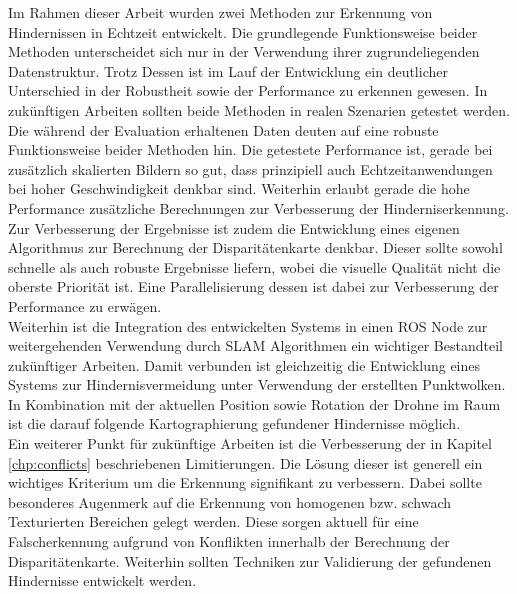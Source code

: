 Im Rahmen dieser Arbeit wurden zwei Methoden zur Erkennung von Hindernissen in Echtzeit entwickelt. Die grundlegende Funktionsweise beider Methoden unterscheidet sich nur in der Verwendung ihrer zugrundeliegenden Datenstruktur. Trotz Dessen ist im Lauf der Entwicklung ein deutlicher Unterschied in der Robustheit sowie der Performance zu erkennen gewesen. In zukünftigen Arbeiten sollten beide Methoden in realen Szenarien getestet werden.\\

\noindent
Die während der Evaluation erhaltenen Daten deuten auf eine robuste Funktionsweise beider Methoden hin. Die getestete Performance ist, gerade bei zusätzlich skalierten Bildern so gut, dass prinzipiell auch Echtzeitanwendungen bei hoher Geschwindigkeit denkbar sind. Weiterhin erlaubt gerade die hohe Performance zusätzliche Berechnungen zur Verbesserung der Hinderniserkennung.\\

\noindent
Zur Verbesserung der Ergebnisse ist zudem die Entwicklung eines eigenen Algorithmus zur Berechnung der Disparitätenkarte denkbar. Dieser sollte sowohl schnelle als auch robuste Ergebnisse liefern, wobei die visuelle Qualität nicht die oberste Priorität ist. Eine Parallelisierung dessen ist dabei zur Verbesserung der Performance zu erwägen.\\

\noindent
Weiterhin ist die Integration des entwickelten Systems in einen ROS Node zur weitergehenden Verwendung durch SLAM Algorithmen ein wichtiger Bestandteil zukünftiger Arbeiten. Damit verbunden ist gleichzeitig die Entwicklung eines Systems zur Hindernisvermeidung unter Verwendung der erstellten Punktwolken. In Kombination mit der aktuellen Position sowie Rotation der Drohne im Raum ist die darauf folgende Kartographierung gefundener Hindernisse möglich.\\

\noindent
Ein weiterer Punkt für zukünftige Arbeiten ist die Verbesserung der in Kapitel \ref{chp:conflicts} beschriebenen Limitierungen. Die Lösung dieser ist generell ein wichtiges Kriterium um die Erkennung signifikant zu verbessern. Dabei sollte besonderes Augenmerk auf die Erkennung von homogenen bzw. schwach Texturierten Bereichen gelegt werden. Diese sorgen aktuell für eine Falscherkennung aufgrund von Konflikten innerhalb der Berechnung der Disparitätenkarte. Weiterhin sollten Techniken zur Validierung der gefundenen Hindernisse entwickelt werden.